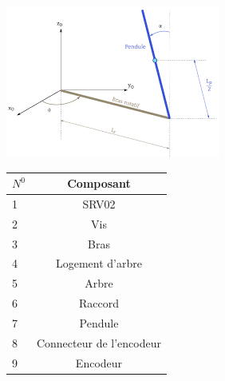 \documentclass[12pt, a4paper, openany]{report}
\begin{document}
\begin{center}
\includegraphics[scale=1]{ShemaPendule.png}
\label{fig2} 
\end{center}


\begin{center}
\begin{tabular}{|l|c|}
\hline \rowcolor{mauve} $N^{0}$ & Composant\\
\hline 1 & SRV02\\
\hline 2 & Vis\\
\hline 3 & Bras\\
\hline 4 & Logement d’arbre\\
\hline 5 & Arbre\\
\hline 6 & Raccord\\
\hline 7 & Pendule\\
\hline 8 & Connecteur de l'encodeur\\
\hline 9 & Encodeur\\
\hline
\end{tabular}

\end{center}

     
\end{document}
